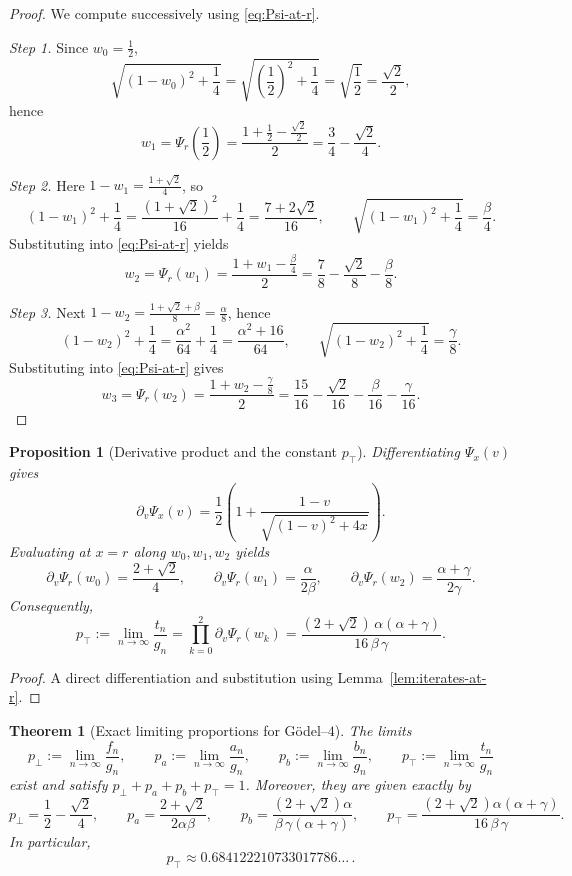\documentclass[11pt]{article}
\newtheorem{proposition}{Proposition}
\newtheorem{theorem}{Theorem}
\newcommand{\ptop}{p_{\top}}
\newcommand{\pbot}{p_{\bot}}
\begin{document}
\begin{proof}
We compute successively using \eqref{eq:Psi-at-r}.

\smallskip\noindent
\emph{Step 1.} Since \(w_0=\frac12\),
\[
\sqrt{(1-w_0)^2+\frac14}=\sqrt{\left(\frac12\right)^2+\frac14}=\sqrt{\frac12}=\frac{\sqrt2}{2},
\]
hence
\[
w_1=\Psi_r\!\left(\frac12\right)
=\frac{1+\frac12-\frac{\sqrt2}{2}}{2}
=\frac34-\frac{\sqrt2}{4}.
\]

\smallskip\noindent
\emph{Step 2.} Here \(1-w_1=\frac{1+\sqrt2}{4}\), so
\[
(1-w_1)^2+\frac14=\frac{(1+\sqrt2)^2}{16}+\frac14=\frac{7+2\sqrt2}{16},
\qquad
\sqrt{(1-w_1)^2+\frac14}=\frac{\beta}{4}.
\]
Substituting into \eqref{eq:Psi-at-r} yields
\[
w_2=\Psi_r(w_1)=\frac{1+w_1-\frac{\beta}{4}}{2}
=\frac78-\frac{\sqrt2}{8}-\frac{\beta}{8}.
\]

\smallskip\noindent
\emph{Step 3.} Next \(1-w_2=\frac{1+\sqrt2+\beta}{8}=\frac{\alpha}{8}\), hence
\[
(1-w_2)^2+\frac14=\frac{\alpha^2}{64}+\frac14=\frac{\alpha^2+16}{64},
\qquad
\sqrt{(1-w_2)^2+\frac14}=\frac{\gamma}{8}.
\]
Substituting into \eqref{eq:Psi-at-r} gives
\[
w_3=\Psi_r(w_2)
=\frac{1+w_2-\frac{\gamma}{8}}{2}
=\frac{15}{16}-\frac{\sqrt2}{16}-\frac{\beta}{16}-\frac{\gamma}{16}.
\]
\end{proof}

\begin{proposition}[Derivative product and the constant \(\ptop \)]\label{prop:p1-product}
Differentiating \(\Psi_x(v)\) gives
\begin{equation}\label{eq:dPsi}
\partial_v\Psi_x(v)
=\frac12\left(1+\frac{1-v}{\sqrt{(1-v)^2+4x}}\right).
\end{equation}
Evaluating at \(x=r\) along \(w_0,w_1,w_2\) yields
\[
\partial_v\Psi_r(w_0)=\frac{2+\sqrt2}{4},\qquad
\partial_v\Psi_r(w_1)=\frac{\alpha}{2\beta},\qquad
\partial_v\Psi_r(w_2)=\frac{\alpha+\gamma}{2\gamma}.
\]
Consequently,
\begin{equation}\label{eq:p1-product}
\ptop :=\lim_{n\to\infty}\frac{t_n}{g_n}
=\prod_{k=0}^{2}\partial_v\Psi_r(w_k)
=\frac{(2+\sqrt2)\,\alpha(\alpha+\gamma)}{16\,\beta\,\gamma}.
\end{equation}
\end{proposition}
\begin{proof}
A direct differentiation and substitution using Lemma~\ref{lem:iterates-at-r}.
\end{proof}


\begin{theorem}[Exact limiting proportions for Gödel--$4$]\label{thm:godel4-exact-proportions}
The limits
\[
\pbot  :=\lim_{n\to\infty}\frac{f_n}{g_n},\qquad
p_a:=\lim_{n\to\infty}\frac{a_n}{g_n},\qquad
p_b:=\lim_{n\to\infty}\frac{b_n}{g_n},\qquad
\ptop :=\lim_{n\to\infty}\frac{t_n}{g_n}
\]
exist and satisfy \(\pbot +p_a+p_b+\ptop =1\). Moreover, they are given exactly by
\[
\pbot=\frac12-\frac{\sqrt2}{4},
\qquad
p_a=\frac{2+\sqrt2}{2\alpha\beta},
\qquad
p_b=\frac{(2+\sqrt2)\alpha}{\beta\,\gamma(\alpha+\gamma)},
\qquad
\ptop =\frac{(2+\sqrt2)\alpha(\alpha+\gamma)}{16\,\beta\,\gamma}.
\]
In particular,
\[
\ptop \approx 0.684122210733017786\ldots\, .
\]
\end{theorem}
\end{document}
